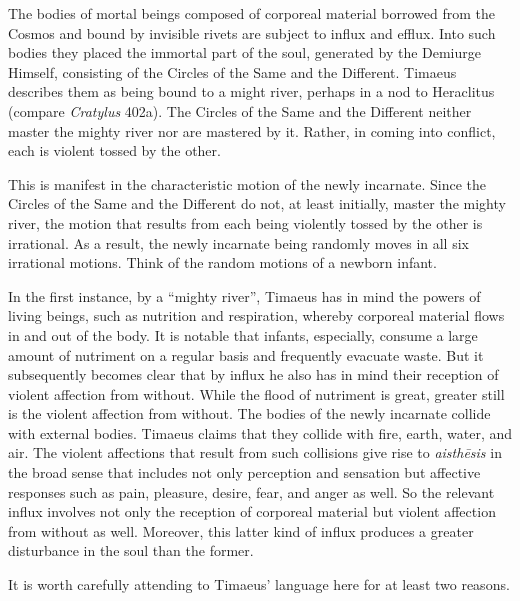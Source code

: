 The bodies of mortal beings composed of corporeal material borrowed from the Cosmos and bound by invisible rivets are subject to influx and efflux. Into such bodies they placed the immortal part of the soul, generated by the Demiurge Himself, consisting of the Circles of the Same and the Different. Timaeus describes them as being bound to a might river, perhaps in a nod to Heraclitus (compare \emph{Cratylus} 402a). The Circles of the Same and the Different neither master the mighty river nor are mastered by it. Rather, in coming into conflict, each is violent tossed by the other.

This is manifest in the characteristic motion of the newly incarnate. Since the Circles of the Same and the Different do not, at least initially, master the mighty river, the motion that results from each being violently tossed by the other is irrational. As a result, the newly incarnate being randomly moves in all six irrational motions. Think of the random motions of a newborn infant.

In the first instance, by a ``mighty river'', Timaeus has in mind the powers of living beings, such as nutrition and respiration, whereby corporeal material flows in and out of the body. It is notable that infants, especially, consume a large amount of nutriment on a regular basis and frequently evacuate waste.  But it subsequently becomes clear that by influx he also has in mind their reception of violent affection from without. While the flood of nutriment is great, greater still is the violent affection from without. The bodies of the newly incarnate collide with external bodies. Timaeus claims that they collide with fire, earth, water, and air. The violent affections that result from such collisions give rise to \emph{aisthēsis} in the broad sense that includes not only perception and sensation but affective responses such as pain, pleasure, desire, fear, and anger as well. So the relevant influx involves not only the reception of corporeal material but violent affection from without as well. Moreover, this latter kind of influx produces a greater disturbance in the soul than the former.

It is worth carefully attending to Timaeus' language here for at least two reasons.

